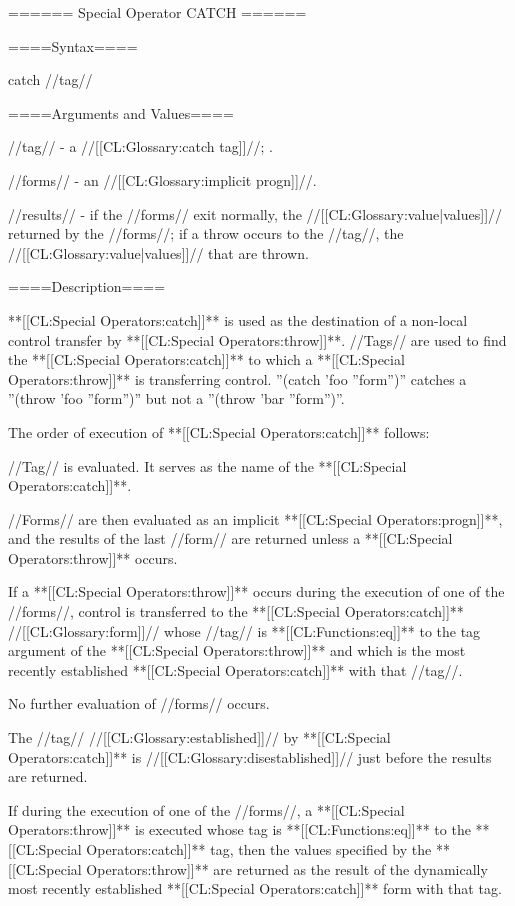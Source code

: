 ====== Special Operator CATCH ======

====Syntax====

\DefspecWithValues catch {//tag// } {}

====Arguments and Values====

//tag// - a //[[CL:Glossary:catch tag]]//; \eval.

//forms// - an //[[CL:Glossary:implicit progn]]//.

//results// - if the //forms// exit normally, the //[[CL:Glossary:value|values]]// returned by the //forms//; if a throw occurs to the //tag//, the //[[CL:Glossary:value|values]]// that are thrown.

====Description====

**[[CL:Special Operators:catch]]** is used as the destination of a non-local control transfer by **[[CL:Special Operators:throw]]**. //Tags// are used to find the **[[CL:Special Operators:catch]]** to which a **[[CL:Special Operators:throw]]** is transferring control. ''(catch 'foo ''form'')'' catches a ''(throw 'foo ''form'')'' but not a ''(throw 'bar ''form'')''.

The order of execution of **[[CL:Special Operators:catch]]** follows:

\beginlist {} //Tag// is evaluated. It serves as the name of the **[[CL:Special Operators:catch]]**.

 //Forms// are then evaluated as an implicit **[[CL:Special Operators:progn]]**, and the results of the last //form// are returned unless a **[[CL:Special Operators:throw]]** occurs.

 If a **[[CL:Special Operators:throw]]** occurs during the execution of one of the //forms//, control is transferred to the **[[CL:Special Operators:catch]]** //[[CL:Glossary:form]]// whose //tag// is **[[CL:Functions:eq]]** to the tag argument of the **[[CL:Special Operators:throw]]** and which is the most recently established **[[CL:Special Operators:catch]]** with that //tag//.

No further evaluation of //forms// occurs.

 The //tag// //[[CL:Glossary:established]]// by **[[CL:Special Operators:catch]]** is //[[CL:Glossary:disestablished]]// just before the results are returned.

\endlist

If during the execution of one of the //forms//, a **[[CL:Special Operators:throw]]** is executed whose tag is **[[CL:Functions:eq]]** to the **[[CL:Special Operators:catch]]** tag, then the values specified by the **[[CL:Special Operators:throw]]** are returned as the result of the dynamically most recently established **[[CL:Special Operators:catch]]** form with that tag.


